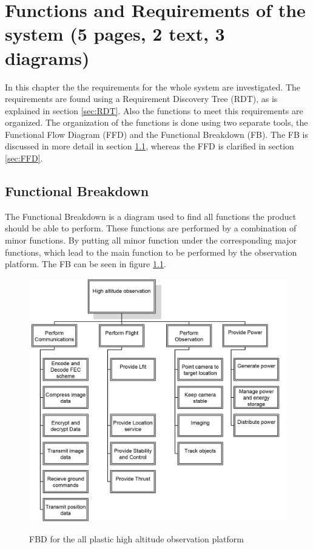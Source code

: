\documentclass[a4paper]{report}
\begin{document}
\chapter{Functions and Requirements of the system (5 pages, 2 text, 3 diagrams)}\label{chap:Functions}
In this chapter the the requirements for the whole system are investigated. The requirements are found using a Requirement Discovery Tree (RDT), as is explained in section \ref{sec:RDT}. Also the functions to meet this requirements are organized. The organization of the functions is done using two separate tools, the Functional Flow Diagram (FFD) and the Functional Breakdown (FB). The FB is discussed in more detail in section \ref{sec:FB}, whereas the FFD is clarified in section \ref{sec:FFD}. 

\section{Functional Breakdown}\label{sec:FB}
The Functional Breakdown is a diagram used to find all functions the product should be able to perform. These functions are performed by a combination of minor functions. By putting all minor function under the corresponding major functions, which lead to the main function to be performed by the observation platform. The FB can be seen in figure \ref{fig:FBD}.

\begin{figure}[ht]
\includegraphics[width = \textwidth]{Figures/FBS/FBS.png}
\label{fig:FBD}
\caption{FBD for the all plastic high altitude observation platform}
\end{figure}
\end{document}
